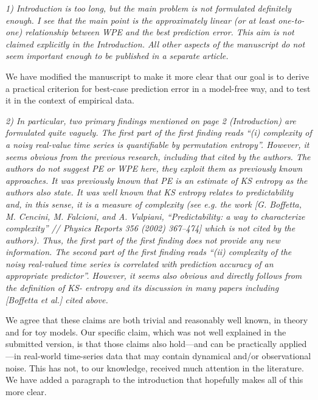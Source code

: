 \documentclass[12pt]{article}
\begin{document}
\emph{1) Introduction is too long, but the main problem is not
  formulated definitely enough. I see that the main point is the
  approximately linear (or at least one-to-one) relationship between
  WPE and the best prediction error. This aim is not claimed
  explicitly in the Introduction. All other aspects of the manuscript
  do not seem important enough to be published in a separate article.}

We have modified the manuscript to make it more clear that our goal is
to derive a practical criterion for best-case prediction error in a
model-free way, and to test it in the context of empirical data.

\emph{2) In particular, two primary findings mentioned on page 2
  (Introduction) are formulated quite vaguely. The first part of the
  first finding reads ``(i) complexity of a noisy real-value time
  series is quantifiable by permutation entropy''. However, it seems
  obvious from the previous research, including that cited by the
  authors. The authors do not suggest PE or WPE here, they exploit
  them as previously known approaches. It was previously known that PE
  is an estimate of KS entropy as the authors also state. It was well
  known that KS entropy relates to predictability and, in this sense,
  it is a measure of complexity (see e.g. the work [G. Boffetta,
    M. Cencini, M. Falcioni, and A.  Vulpiani, ``Predictability: a way
    to characterize complexity'' // Physics Reports 356 (2002)
    367–474] which is not cited by the authors). Thus, the first part
  of the first finding does not provide any new information. The
  second part of the first finding reads ``(ii) complexity of the
  noisy real-valued time series is correlated with prediction accuracy
  of an appropriate predictor''.  However, it seems also obvious and
  directly follows from the definition of KS- entropy and its
  discussion in many papers including [Boffetta et al.] cited above.}

We agree that these claims are both trivial and reasonably well known,
in theory and for toy models.  Our specific claim, which was not well
explained in the submitted version, is that those claims also
hold---and can be practically applied---in real-world time-series data
that may contain dynamical and/or observational noise.  This has not,
to our knowledge, received much attention in the literature.  We have
added a paragraph to the introduction that hopefully makes all of this
more clear.
\end{document}
